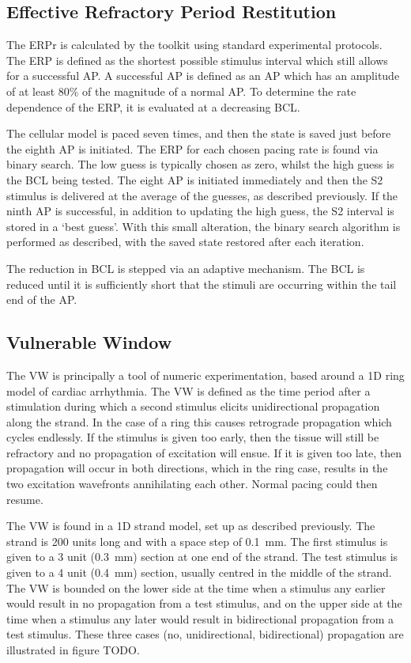 \subsection{Effective Refractory Period Restitution}

The ERPr is calculated by the toolkit using standard experimental protocols.
The ERP is defined as the shortest possible stimulus interval which still allows
for a successful AP.  A successful AP is defined as an AP which has an amplitude
of at least 80\% of the magnitude of a normal AP.  To determine the rate
dependence of the ERP, it is evaluated at a decreasing BCL.


The cellular model is paced seven times, and then the state is saved just before
the eighth AP is initiated.  The ERP for each chosen pacing rate is found via
binary search.  The low guess is typically chosen as zero, whilst the high guess
is the BCL being tested.  The eight AP is initiated immediately and then the S2
stimulus is delivered at the average of the guesses, as described previously.
If the ninth AP is successful, in addition to updating the high guess, the S2
interval is stored in a `best guess'.  With this small alteration, the binary
search algorithm is performed as described, with the saved state restored after
each iteration.

The reduction in BCL is stepped via an adaptive mechanism.  The BCL is reduced
until it is sufficiently short that the stimuli are occurring within the tail end
of the AP.

\subsection{Vulnerable Window}

The VW is principally a tool of numeric experimentation, based around a 1D ring
model of cardiac arrhythmia.  The VW is defined as the time period after a
stimulation during which a second stimulus elicits unidirectional propagation
along the strand.  In the case of a ring this causes retrograde propagation
which cycles endlessly.  If the stimulus is given too early, then the tissue
will still be refractory and no propagation of excitation will ensue.  If it is
given too late, then propagation will occur in both directions, which in the
ring case, results in the two excitation wavefronts annihilating each other.
Normal pacing could then resume.

The VW is found in a 1D strand model, set up as described previously.  The
strand is 200 units long and with a space step of 0.1~mm.  The first stimulus is
given to a 3 unit (0.3~mm) section at one end of the strand.  The test stimulus
is given to a 4 unit (0.4~mm) section, usually centred in the middle of the
strand. The VW is bounded on the lower side at the time when a stimulus any
earlier would result in no propagation from a test stimulus, and on the upper
side at the time when a stimulus any later would result in bidirectional
propagation from a test stimulus.  These three cases (no, unidirectional,
bidirectional) propagation are illustrated in figure TODO.

